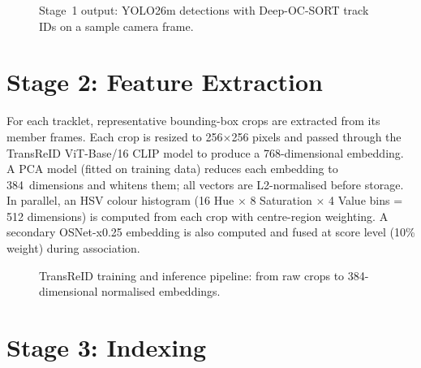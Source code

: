 \begin{figure}[htbp]
\centering
{}
\caption{Stage~1 output: YOLO26m detections with Deep-OC-SORT track IDs on a sample camera frame.}
\label{fig:stage1}
\end{figure}

\section{Stage 2: Feature Extraction}

For each tracklet, representative bounding-box crops are extracted from its member frames. Each crop is resized to 256$\times$256 pixels and passed through the TransReID ViT-Base/16 CLIP model to produce a 768-dimensional embedding. A PCA model (fitted on training data) reduces each embedding to 384~dimensions and whitens them; all vectors are L2-normalised before storage. In parallel, an HSV colour histogram (16 Hue $\times$ 8 Saturation $\times$ 4 Value bins = 512 dimensions) is computed from each crop with centre-region weighting. A secondary OSNet-x0.25 embedding is also computed and fused at score level (10\% weight) during association.

\begin{figure}[htbp]
\centering
{}
\caption{TransReID training and inference pipeline: from raw crops to 384-dimensional normalised embeddings.}
\label{fig:reid_pipeline}
\end{figure}

\section{Stage 3: Indexing}

